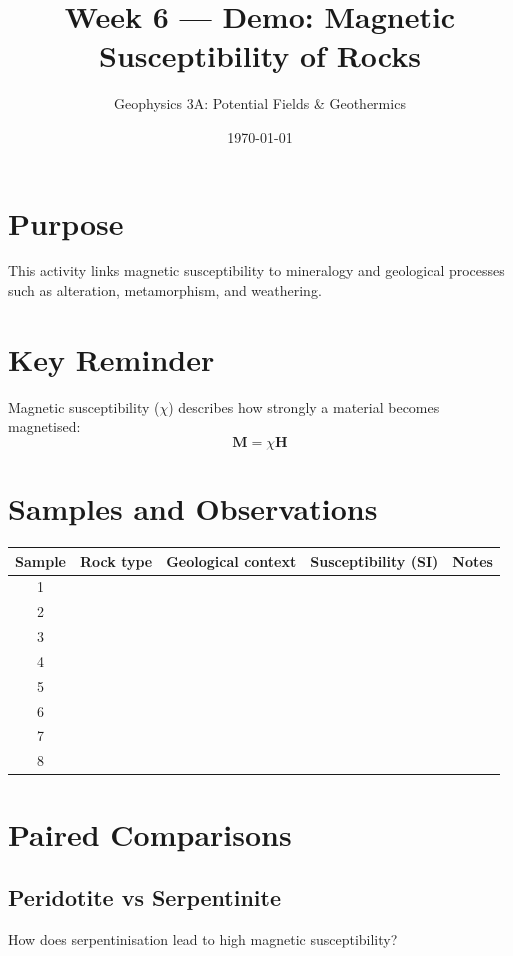 \documentclass[11pt,a4paper]{article}
\title{Week 6 --- Demo: Magnetic Susceptibility of Rocks}
\author{Geophysics 3A: Potential Fields \& Geothermics}
\date{\today}
\begin{document}
\maketitle

\section*{Purpose}

This activity links magnetic susceptibility to mineralogy and geological processes such as alteration, metamorphism, and weathering.

\section*{Key Reminder}

Magnetic susceptibility ($\chi$) describes how strongly a material becomes magnetised:
\[
\mathbf{M} = \chi \mathbf{H}
\]

\section*{Samples and Observations}

\begin{table}
    \centering
    \begin{tabular}{|c|p{2.5cm}|p{2.5cm}|c|p{3cm}|}
        \toprule
        \textbf{Sample} &
        \textbf{Rock type} &
        \textbf{Geological context} &
        \textbf{Susceptibility (SI)} &
        \textbf{Notes} \\
        \midrule
        1 & & & & \\
        2 & & & & \\
        3 & & & & \\
        4 & & & & \\
        5 & & & & \\
        6 & & & & \\
        7 & & & & \\
        8 & & & & \\
        \bottomrule
    \end{tabular}
\end{table}

\section*{Paired Comparisons}

\subsection*{Peridotite vs Serpentinite}
How does serpentinisation lead to high magnetic susceptibility?
\end{document}
